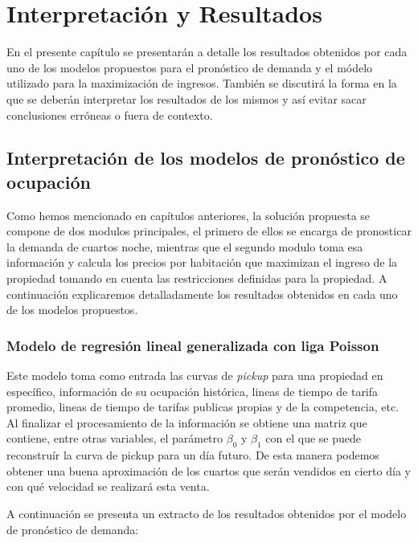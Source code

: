 \chapter{Interpretación y Resultados}
\label{ch:results}

En el presente capítulo se presentarán a detalle los resultados obtenidos por cada uno de los modelos propuestos para el pronóstico de demanda y el módelo utilizado para la maximización de ingresos. También se discutirá la forma en la que se deberán interpretar los resultados de los mismos y así evitar sacar conclusiones erróneas o fuera de contexto.

\section*{Interpretación de los modelos de pronóstico de ocupación}
Como hemos mencionado en capítulos anteriores, la solución propuesta se compone de dos modulos principales, el primero de ellos se encarga de pronosticar la demanda de cuartos noche, mientras que el segundo modulo toma esa información y calcula los precios por habitación  que  maximizan  el  ingreso  de  la  propiedad  tomando  en  cuenta  las restricciones definidas para la propiedad. A continuación explicaremos detalladamente los resultados obtenidos en cada uno de los modelos propuestos.


\subsection*{Modelo de regresión lineal generalizada con liga Poisson}

Este modelo toma como entrada las curvas de \emph{pickup} para una propiedad en específico, información de su ocupación histórica, lineas de tiempo de tarifa promedio, lineas de tiempo de tarifas publicas propias y de la competencia, etc. Al finalizar el procesamiento de la información se obtiene una matriz que contiene, entre otras variables, el parámetro $\beta_0$ y $\beta_1$ con el que se puede reconstruír la curva de pickup para un día futuro. De esta manera podemos obtener una buena aproximación de los cuartos que serán vendidos en cierto día y con qué velocidad se realizará esta venta.

A continuación se presenta un extracto de los resultados obtenidos por el modelo de pronóstico de demanda:

